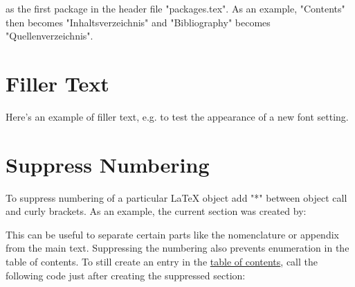  as the first package in the header file "packages.tex".
As an example, "Contents" then becomes "Inhaltsverzeichnis" and "Bibliography" becomes "Quellenverzeichnis".


\section{Filler Text}

Here's an example of filler text, e.g. to test the appearance of a new font setting.

\lipsum[1]

\section*{Suppress Numbering}

To suppress numbering of a particular LaTeX object add "*" between object call and curly brackets.
As an example, the current section was created by:



This can be useful to separate certain parts like the nomenclature or appendix from the main text.
Suppressing the numbering also prevents enumeration in the table of contents. 
To still create an entry in the \hyperlink{toc:label}{table of contents}, call the following code just after creating the suppressed section:


